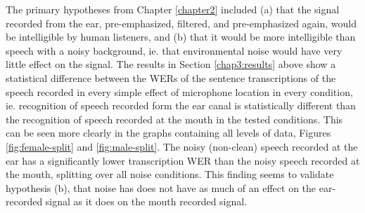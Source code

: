 

The primary hypotheses from Chapter \ref{chapter2} included (a) that the signal recorded from the ear, pre-emphasized, filtered, and pre-emphasized again, would be intelligible by human listeners, and (b) that it would be more intelligible than speech with a noisy background, ie. that environmental noise would have very little effect on the signal.  The results in Section \ref{chap3:results} above show a statistical difference between the WERs of the sentence transcriptions of the speech recorded in every simple effect of microphone location in every condition, ie. recognition of speech recorded form the ear canal is statistically different than the recognition of speech recorded at the mouth in the tested conditions.  This can be seen more clearly in the graphs containing all levels of data, Figures \ref{fig:female-split} and \ref{fig:male-split}.  The noisy (non-clean) speech recorded at the ear has a significantly lower transcription WER than the noisy speech recorded at the mouth, splitting over all noise conditions.  This finding seems to validate hypothesis (b), that noise has does not have as much of an effect on the ear-recorded signal as it does on the mouth recorded signal.

